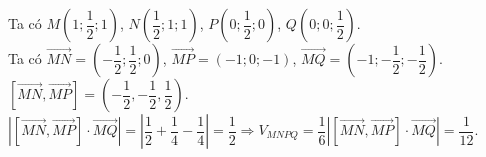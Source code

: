 \begin{ex}
{\begin{center}
\begin{tikzpicture}[line join = round,line cap=round,>=stealth,font=\footnotesize,scale=1]
				\end{tikzpicture}
		\end{center}
		Ta có  $M\left(1;\dfrac{1}{2};1\right)$, $N\left(\dfrac{1}{2};1;1\right)$, $P\left(0;\dfrac{1}{2};0\right)$, $Q\left(0;0;\dfrac{1}{2}\right)$.\\
		Ta có $\overrightarrow{MN}=\left(-\dfrac{1}{2}; \dfrac{1}{2};  0\right)$, $\overrightarrow{MP}=(-1; 0; -1)$, $\overrightarrow{MQ}=\left(-1; -\dfrac{1}{2}; -\dfrac{1}{2}\right)$.\\
		$\left[\overrightarrow{MN},  \overrightarrow{MP}\right]= \left(-\dfrac{1}{2}, -\dfrac{1}{2}, \dfrac{1}{2}\right)$.\\
		$\left|\left[\overrightarrow{MN}, \overrightarrow{MP}\right]\cdot\overrightarrow{MQ}\right| = \left|\dfrac{1}{2} + \dfrac{1}{4} - \dfrac{1}{4}\right| = \dfrac{1}{2} \Rightarrow V_{MNPQ} = \dfrac{1}{6}\left|\left[\overrightarrow{MN},  \overrightarrow{MP}\right]\cdot\overrightarrow{MQ}\right| = \dfrac{1}{12}$.
	 }
\end{ex}

